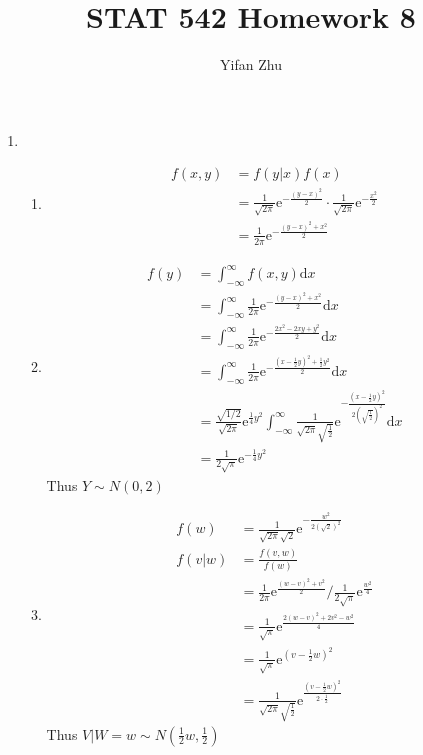 \documentclass{article}
\begin{document}
	

	
	\title{STAT 542 Homework 8}
	\author{Yifan Zhu}
	\maketitle
	
	\begin{enumerate}[leftmargin = 0 em, label = \arabic*., font = \bfseries]
	\item 
	\begin{enumerate}
		\item 
		\begin{align*}
		f(x,y) &= f(y|x) f(x)\\
		&= \frac{1}{\sqrt{2 \pi}} \mathrm{e}^{- \frac{(y - x)^2}{2}} \cdot \frac{1}{\sqrt{2 \pi}} \mathrm{e}^{- \frac{x^2}{2}}\\
		& = \frac{1}{2 \pi} \mathrm{e}^{- \frac{(y - x)^2 +x^2}{2}}
		\end{align*}
		
		\item 
		\begin{align*}
		f(y) &= \int_{-\infty}^{\infty} f(x,y) \mathrm{d}x\\
		& = \int_{-\infty}^{\infty} \frac{1}{2 \pi} \mathrm{e}^{- \frac{(y - x)^2 + x^2}{2}} \mathrm{d}x\\
		& = \int_{-\infty}^{\infty} \frac{1}{2 \pi} \mathrm{e}^{- \frac{2 x^2 - 2 xy + y^2}{2}} \mathrm{d}x\\
		& = \int_{-\infty}^{\infty} \frac{1}{2 \pi} \mathrm{e}^{- \frac{(x - \frac{1}{2} y)^2 + \frac{1}{2}y^2 }{2}} \mathrm{d}x\\
		& = \frac{\sqrt{1/2}}{\sqrt{2 \pi}} \mathrm{e}^{\frac{1}{4} y^2} \int_{-\infty}^{\infty} \frac{1}{\sqrt{2 \pi} \sqrt{\frac{1}{2}}} \mathrm{e}^{- \frac{(x - \frac{1}{2} y)^2}{2 (\sqrt{\frac{1}{2}})^2}} \mathrm{d}x \\
		& = \frac{1}{2 \sqrt{\pi}} \mathrm{e}^{- \frac{1}{4}y^2}
		\end{align*}
		Thus $Y \sim N(0, 2)$

		\item 
		\begin{align*}
		f(w) & = \frac{1}{\sqrt{2 \pi}\sqrt{2}} \mathrm{e}^{-\frac{w^2}{2 (\sqrt{2})^2}}\\
		f(v|w) & = \frac{f(v,w)}{f(w)}\\
		& = \frac{1}{2 \pi} \mathrm{e}^{\frac{(w - v)^2 + v^2}{2}} \bigg/ \frac{1}{2 \sqrt{\pi}} \mathrm{e}^{\frac{w^2}{4}}\\
		& = \frac{1}{\sqrt{\pi}} \mathrm{e}^{\frac{2(w - v)^2 + 2v^2 - w^2}{4}}\\
		& = \frac{1}{\sqrt{\pi}} \mathrm{e}^{(v - \frac{1}{2} w)^2}\\
		& = \frac{1}{\sqrt{2 \pi} \sqrt{\frac{1}{2}}} \mathrm{e}^{\frac{(v - \frac{1}{2}w )^2}{2 \cdot \frac{1}{2}}}
		\end{align*}
		Thus $V|W = w \sim N( \frac{1}{2}w , \frac{1}{2})$
		

\end{enumerate}
\end{enumerate}
\end{document}
